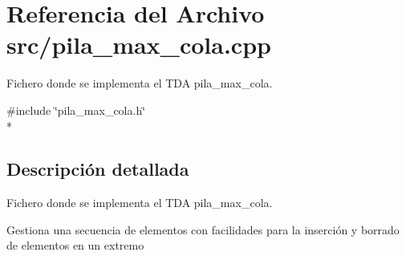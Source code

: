 \section{Referencia del Archivo src/pila\+\_\+max\+\_\+cola.cpp}
\label{pila__max__cola_8cpp}


Fichero donde se implementa el T\+DA pila\+\_\+max\+\_\+cola.  


{\ttfamily \#include \char`\"{}pila\+\_\+max\+\_\+cola.\+h\char`\"{}}\\*


\subsection{Descripción detallada}
Fichero donde se implementa el T\+DA pila\+\_\+max\+\_\+cola. 

Gestiona una secuencia de elementos con facilidades para la inserción y borrado de elementos en un extremo 